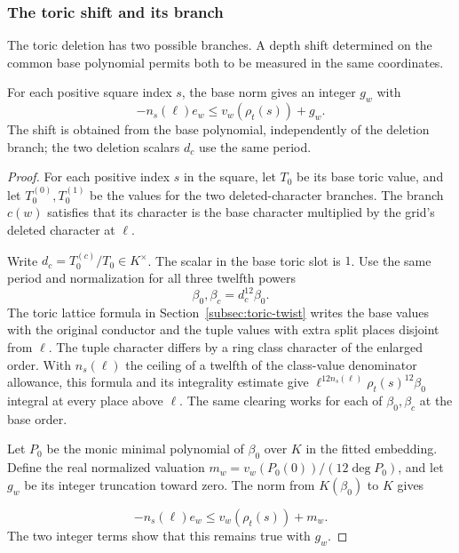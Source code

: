 \subsubsection{The toric shift and its branch}

The toric deletion has two possible branches. A depth shift determined on the common base polynomial permits both to be measured in the same coordinates.

\begin{proposition}\label{prop:fitted-toric-denominator-shift}
For each positive square index \(s\), the base norm gives an
integer \(g_w\) with
\[
  -n_s(\ell)e_w\le v_w(\rho_t(s))+g_w .
\]
The shift is obtained from the base polynomial, independently of
the deletion branch; the two deletion scalars \(d_c\) use the same
period.
\end{proposition}

\begin{proof}
For each positive index \(s\) in the square, let \(T_0\) be
its base toric value, and let \(T_0^{(0)},T_0^{(1)}\) be the
values for the two deleted-character branches. The branch
\(c(w)\) satisfies that its character is the base character
multiplied by the grid's deleted character at \(\ell\).

Write \(d_c=T_0^{(c)}/T_0\in K^\times\).
The scalar in the base toric slot is \(1\).
Use the same period and normalization for all three twelfth
powers 
\[
  \beta_0,\beta_c=d_c^{12}\beta_0.
\]
 The toric
lattice formula in Section~\ref{subsec:toric-twist}
writes the base values with the original conductor and the
tuple values with extra split places disjoint from \(\ell\).
The tuple character differs by a ring class character of the
enlarged order. With \(n_s(\ell)\) the ceiling of a twelfth of
the class-value denominator allowance, this formula and its
integrality estimate give
\(\ell^{12n_s(\ell)}\rho_t(s)^{12}\beta_0\)
integral at every place above \(\ell\). The same clearing
works for each of \(\beta_0,\beta_c\) at the base order.

Let \(P_0\) be the monic minimal polynomial of \(\beta_0\)
over \(K\) in the fitted embedding. Define the real normalized
valuation \(m_w=v_w(P_0(0))/(12\deg P_0)\), and let
\(g_w\) be its integer truncation toward zero. The norm
from \(K(\beta_0)\) to \(K\) gives

\[
  -n_s(\ell)e_w\le v_w(\rho_t(s))+m_w.
\]
The two integer terms show that this remains true with \(g_w\).

\end{proof}

